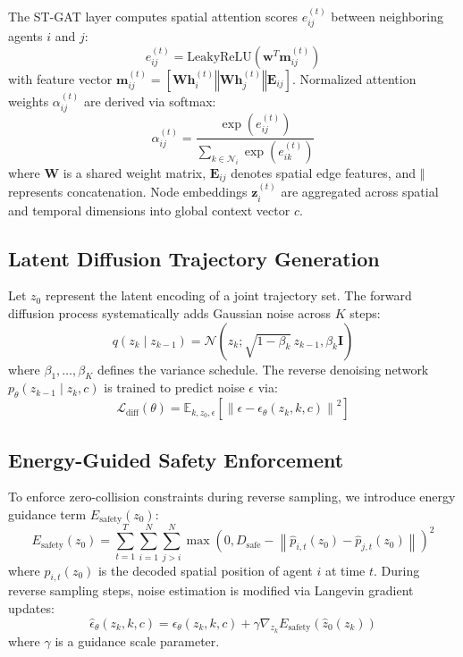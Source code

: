 \documentclass[runningheads]{llncs}
\begin{document}
The ST-GAT layer computes spatial attention scores $e_{ij}^{(t)}$ between neighboring agents $i$ and $j$:
\begin{equation}
e_{ij}^{(t)} = \text{LeakyReLU}(\mathbf{w}^T \mathbf{m}_{ij}^{(t)})
\end{equation}
with feature vector $\mathbf{m}_{ij}^{(t)} = [\mathbf{W}\mathbf{h}_i^{(t)} \mathbin{\Vert} \mathbf{W}\mathbf{h}_j^{(t)} \mathbin{\Vert} \mathbf{E}_{ij}]$. Normalized attention weights $\alpha_{ij}^{(t)}$ are derived via softmax:
\begin{equation}
\alpha_{ij}^{(t)} = \frac{\exp(e_{ij}^{(t)})}{\sum_{k \in \mathcal{N}_i} \exp(e_{ik}^{(t)})}
\end{equation}
where $\mathbf{W}$ is a shared weight matrix, $\mathbf{E}_{ij}$ denotes spatial edge features, and $\mathbin{\Vert}$ represents concatenation. Node embeddings $\mathbf{z}_i^{(t)}$ are aggregated across spatial and temporal dimensions into global context vector $c$.

\subsection{Latent Diffusion Trajectory Generation}
Let $z_0$ represent the latent encoding of a joint trajectory set. The forward diffusion process systematically adds Gaussian noise across $K$ steps:
\begin{equation}
q(z_k \mid z_{k-1}) = \mathcal{N}\left(z_k; \sqrt{1 - \beta_k}\, z_{k-1}, \beta_k \mathbf{I}\right)
\end{equation}
where $\beta_1, \dots, \beta_K$ defines the variance schedule. The reverse denoising network $p_\theta(z_{k-1} \mid z_k, c)$ is trained to predict noise $\epsilon$ via:
\begin{equation}
\mathcal{L}_{\text{diff}}(\theta) = \mathbb{E}_{k, z_0, \epsilon} \left[ \left\| \epsilon - \epsilon_\theta(z_k, k, c) \right\|^2 \right]
\end{equation}

\subsection{Energy-Guided Safety Enforcement}
To enforce zero-collision constraints during reverse sampling, we introduce energy guidance term $E_{\text{safety}}(z_0)$:
\begin{equation}
E_{\text{safety}}(z_0) = \sum_{t=1}^T \sum_{i=1}^N \sum_{j > i}^N \max\left(0, D_{\text{safe}} - \left\|\hat{p}_{i,t}(z_0) - \hat{p}_{j,t}(z_0)\right\|\right)^2
\end{equation}
where $\hat{p}_{i,t}(z_0)$ is the decoded spatial position of agent $i$ at time $t$. During reverse sampling steps, noise estimation is modified via Langevin gradient updates:
\begin{equation}
\hat{\epsilon}_\theta(z_k, k, c) = \epsilon_\theta(z_k, k, c) + \gamma \nabla_{z_k} E_{\text{safety}}(\hat{z}_0(z_k))
\end{equation}
where $\gamma$ is a guidance scale parameter.
\end{document}
